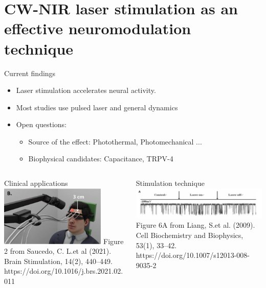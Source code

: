 \documentclass[aspectratio=43]{beamer}
\begin{document}
\section[CW-NIR Neuromodulation]{CW-NIR laser stimulation as an effective neuromodulation technique}
\begin{frame}{Current findings}
	\begin{itemize}
		\item{Laser stimulation accelerates neural activity.}
		\item{Most studies use pulsed laser and general dynamics}
		\item{Open questions:}
		\begin{itemize}
			\item Source of the effect: Photothermal, Photomechanical ...
			\item Biophysical candidates: Capacitance, TRPV-4 
		\end{itemize}
	\end{itemize}
	\vspace{10pt}
	\begin{columns}
		\begin{column}{0.5\textwidth}
			\centering
			Clinical applications\\
			\includegraphics[width=0.8\textwidth]{Images/saucedo.png} \tiny{Figure 2 from Saucedo, C. L.et al (2021). Brain Stimulation, 14(2), 440–449. https://doi.org/10.1016/j.brs.2021.02.011}
		\end{column}
		\begin{column}{0.5\textwidth}
			\centering
			Stimulation technique\\
			\includegraphics[width=\textwidth]{Images/liang.png} \tiny{Figure 6A from Liang, S.et al. (2009). Cell Biochemistry and Biophysics, 53(1), 33–42. https://doi.org/10.1007/s12013-008-9035-2
			}
		\end{column}	
	\end{columns}
	
	
\end{frame}
\end{document}
